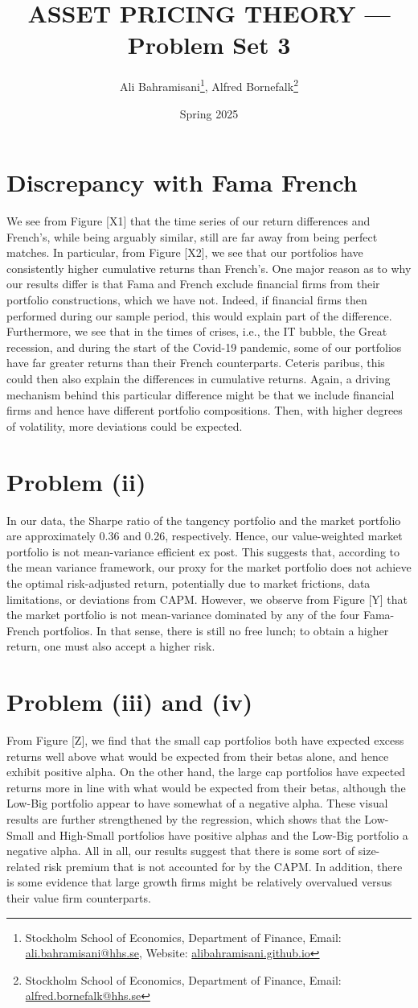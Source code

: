 \documentclass[a4paper,10pt,american]{article}
\title{ASSET PRICING THEORY --- Problem Set 3}
\author{Ali Bahramisani\thanks{Stockholm School
of Economics, Department of Finance, Email: 
\href{mailto:ali.bahramisani@hhs.se}{ali.bahramisani@hhs.se}, 
Website: \href{https://alibahramisani.github.io}{alibahramisani.github.io}},
Alfred Bornefalk\thanks{Stockholm School
of Economics, Department of Finance, Email: 
\href{mailto:alfred.bornefalk@hhs.se}{alfred.bornefalk@hhs.se}}}
\date{Spring 2025}
\begin{document}
    \maketitle
    \section*{Discrepancy with Fama French}
    We see from Figure [X1] that the time series of our return differences and French's, while being arguably similar, still are far away from being perfect matches. In particular, from Figure [X2], we see that our portfolios have consistently higher cumulative returns than French's. One major reason as to why our results differ is that Fama and French exclude financial firms from their portfolio constructions, which we have not. Indeed, if financial firms then performed during our sample period, this would explain part of the difference. Furthermore, we see that in the times of crises, i.e., the IT bubble, the Great recession, and during the start of the Covid-19 pandemic, some of our portfolios have far greater returns than their French counterparts. Ceteris paribus, this could then also explain the differences in cumulative returns. Again, a driving mechanism behind this particular difference might be that we include financial firms and hence have different portfolio compositions. Then, with higher degrees of volatility, more deviations could be expected.
    \section*{Problem (ii)}
    In our data, the Sharpe ratio of the tangency portfolio and the market portfolio are approximately 0.36 and 0.26, respectively. Hence, our value-weighted market portfolio is not mean-variance efficient ex post. This suggests that, according to the mean variance framework, our proxy for the market portfolio does not achieve the optimal risk-adjusted return, potentially due to market frictions, data limitations, or deviations from CAPM. However, we observe from Figure [Y] that the market portfolio is not mean-variance dominated by any of the four Fama-French portfolios. In that sense, there is still no free lunch; to obtain a higher return, one must also accept a higher risk. 
    \section*{Problem (iii) and (iv)}
    From Figure [Z], we find that the small cap portfolios both have expected excess returns well above what would be expected from their betas alone, and hence exhibit positive alpha. On the other hand, the large cap portfolios have expected returns more in line with what would be expected from their betas, although the Low-Big portfolio appear to have somewhat of a negative alpha. These visual results are further strengthened by the regression, which shows that the Low-Small and High-Small portfolios have positive alphas and the Low-Big portfolio a negative alpha. All in all, our results suggest that there is some sort of size-related risk premium that is not accounted for by the CAPM. In addition, there is some evidence that large growth firms might be relatively overvalued versus their value firm counterparts.
\end{document}

